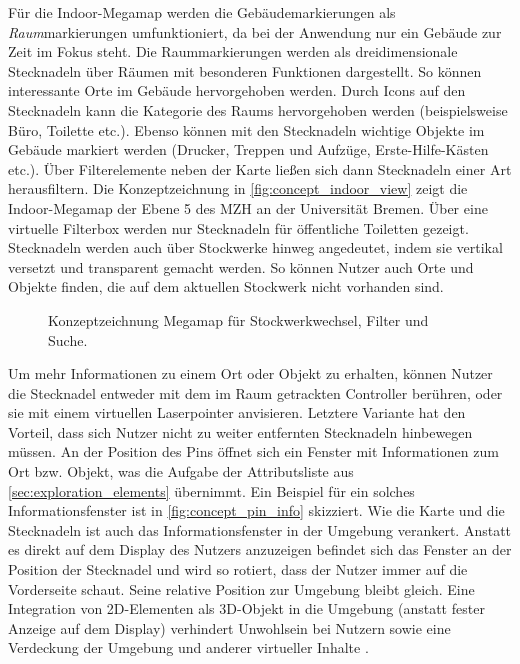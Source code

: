 Für die Indoor-Megamap werden die Gebäudemarkierungen als \emph{Raum}markierungen umfunktioniert, da bei der Anwendung nur ein Gebäude zur Zeit im Fokus steht.
Die Raummarkierungen werden als dreidimensionale Stecknadeln über Räumen mit besonderen Funktionen dargestellt.
So können interessante Orte im Gebäude hervorgehoben werden.
Durch Icons auf den Stecknadeln kann die Kategorie des Raums hervorgehoben werden (beispielsweise Büro, Toilette etc.).
Ebenso können mit den Stecknadeln wichtige Objekte im Gebäude markiert werden (Drucker, Treppen und Aufzüge, Erste-Hilfe-Kästen etc.).
Über Filterelemente neben der Karte ließen sich dann Stecknadeln einer Art herausfiltern.
Die Konzeptzeichnung in \autoref{fig:concept_indoor_view} zeigt die Indoor-Megamap der Ebene 5 des MZH an der Universität Bremen.
Über eine virtuelle Filterbox werden nur Stecknadeln für öffentliche Toiletten gezeigt.
Stecknadeln werden auch über Stockwerke hinweg angedeutet, indem sie vertikal versetzt und transparent gemacht werden.
So können Nutzer auch Orte und Objekte finden, die auf dem aktuellen Stockwerk nicht vorhanden sind.
\vfill
\begin{figure}[h]
	\centering
	\caption{Konzeptzeichnung Megamap für Stockwerkwechsel, Filter und Suche.}
	\label{fig:concept_indoor_view}
\end{figure}

Um mehr Informationen zu einem Ort oder Objekt zu erhalten, können Nutzer die Stecknadel entweder mit dem im Raum getrackten Controller berühren, oder sie mit einem virtuellen Laserpointer anvisieren.
Letztere Variante hat den Vorteil, dass sich Nutzer nicht zu weiter entfernten Stecknadeln hinbewegen müssen.
An der Position des Pins öffnet sich ein Fenster mit Informationen zum Ort bzw. Objekt, was die Aufgabe der Attributsliste aus \autoref{sec:exploration_elements} übernimmt.
Ein Beispiel für ein solches Informationsfenster ist in \autoref{fig:concept_pin_info} skizziert.
Wie die Karte und die Stecknadeln ist auch das Informationsfenster in der Umgebung verankert.
Anstatt es direkt auf dem Display des Nutzers anzuzeigen befindet sich das Fenster an der Position der Stecknadel und wird so rotiert, dass der Nutzer immer auf die Vorderseite schaut.
Seine relative Position zur Umgebung bleibt gleich.
Eine Integration von 2D-Elementen als 3D-Objekt in die Umgebung (anstatt fester Anzeige auf dem Display) verhindert Unwohlsein bei Nutzern sowie eine Verdeckung der Umgebung und anderer virtueller Inhalte \parencite[23]{Schroeder2017}.

